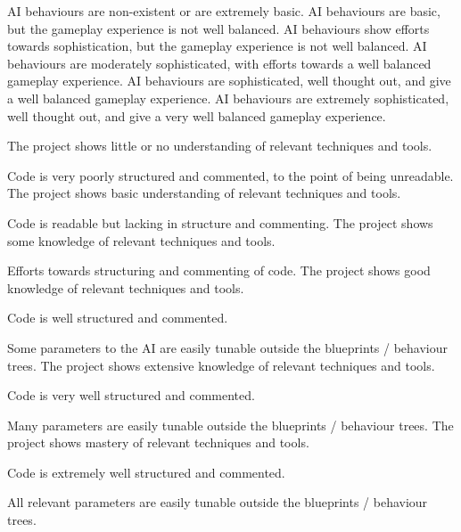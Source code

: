 \documentclass{../../fal_assignment}
\begin{document}
\begin{markingrubric}
        \grade\fail AI behaviours are non-existent or are extremely basic.
		\grade AI behaviours are basic, but the gameplay experience is not well balanced.
		\grade AI behaviours show efforts towards sophistication, but the gameplay experience is not well balanced.
		\grade AI behaviours are moderately sophisticated, with efforts towards a well balanced gameplay experience.
		\grade AI behaviours are sophisticated, well thought out, and give a well balanced gameplay experience.
		\grade AI behaviours are extremely sophisticated, well thought out, and give a very well balanced gameplay experience.

        \grade \fail The project shows little or no understanding of relevant techniques and tools.
			\par Code is very poorly structured and commented, to the point of being unreadable.
        \grade The project shows basic understanding of relevant techniques and tools.
			\par Code is readable but lacking in structure and commenting.
        \grade The project shows some knowledge of relevant techniques and tools.
			\par Efforts towards structuring and commenting of code.
        \grade The project shows good knowledge of relevant techniques and tools.
			\par Code is well structured and commented.
			\par Some parameters to the AI are easily tunable outside the blueprints / behaviour trees.
        \grade The project shows extensive knowledge of relevant techniques and tools.
			\par Code is very well structured and commented.
			\par Many parameters are easily tunable outside the blueprints / behaviour trees.
        \grade The project shows mastery of relevant techniques and tools.
			\par Code is extremely well structured and commented.
			\par All relevant parameters are easily tunable outside the blueprints / behaviour trees.
\end{markingrubric}
\end{document}
